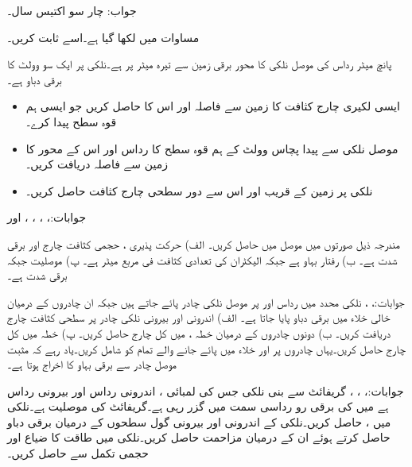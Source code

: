 جواب: چار سو اکتیس  سال۔ 

مساوات  میں   لکھا گیا ہے۔اسے ثابت کریں۔

پانچ میٹر رداس کی موصل نلکی کا محور برقی زمین سے تیرہ میٹر پر ہے۔نلکی پر ایک سو وولٹ کا برقی دباو ہے۔
\begin{itemize}
\item
ایسی لکیری چارج کثافت کا زمین سے فاصلہ اور اس کا  حاصل کریں جو ایسی ہم قوہ سطح  پیدا کرے۔
\item
موصل نلکی سے پیدا پچاس وولٹ کے ہم قوہ سطح کا رداس اور اس کے محور کا زمین سے فاصلہ دریافت کریں۔
\item
نلکی پر زمین کے قریب اور اس سے دور سطحی چارج کثافت حاصل کریں۔
\end{itemize} 

جوابات:، ، ، ،  اور 

مندرجہ ذیل صورتوں میں موصل میں  حاصل کریں۔ الف) حرکت پذیری ، حجمی کثافت چارج  اور برقی شدت  ہے۔ ب) رفتار بہاو  ہے جبکہ الیکٹران کی تعدادی کثافت  فی مربع میٹر ہے۔ پ) موصلیت  جبکہ برقی شدت  ہے۔

جوابات:، ، 
نلکی محدد میں رداس  اور  پر موصل نلکی چادر پائے جاتے ہیں جبکہ ان چادروں کے درمیان خالی خلاء میں  برقی دباو پایا جاتا ہے۔ الف) اندرونی اور بیرونی نلکی چادر پر سطحی کثافت چارج دریافت کریں۔ ب) دونوں چادروں کے درمیان خطہ ،  میں کل چارج حاصل کریں۔ پ) خطہ  میں کل چارج حاصل کریں۔یہاں چادروں پر اور خلاء میں پائے جانے والے تمام کو شامل کریں۔یاد رہے کہ مثبت موصل چادر سے برقی بہاو کا اخراج ہوتا ہے۔

جوابات:، ، ، 
گریفائٹ سے بنی  نلکی جس کی لمبائی ، اندرونی رداس  اور بیرونی رداس  ہے میں  کی برقی رو رداسی سمت میں  گزر رہی ہے۔گریفائٹ  کی موصلیت  ہے۔نلکی میں ،  حاصل کریں۔نلکی کے اندرونی اور بیرونی گول سطحوں کے درمیان برقی دباو  حاصل کرتے ہوئے ان کے درمیان مزاحمت  حاصل کریں۔نلکی میں طاقت کا ضیاع  اور حجمی تکمل  سے حاصل کریں۔

